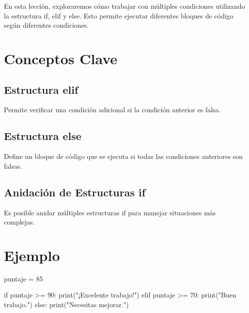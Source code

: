 \documentclass[
  a4paper,
  DIV=11,
  numbers=noendperiod,
  onepage,
  openany]{scrreprt}
\newenvironment{Shaded}{\begin{snugshade}}{\end{snugshade}}
\newcommand{\BuiltInTok}[1]{\textcolor[rgb]{0.00,0.23,0.31}{#1}}
\newcommand{\ControlFlowTok}[1]{\textcolor[rgb]{0.00,0.23,0.31}{#1}}
\newcommand{\DecValTok}[1]{\textcolor[rgb]{0.68,0.00,0.00}{#1}}
\newcommand{\NormalTok}[1]{\textcolor[rgb]{0.00,0.23,0.31}{#1}}
\newcommand{\OperatorTok}[1]{\textcolor[rgb]{0.37,0.37,0.37}{#1}}
\newcommand{\StringTok}[1]{\textcolor[rgb]{0.13,0.47,0.30}{#1}}
\begin{document}
En esta lección, exploraremos cómo trabajar con múltiples condiciones
utilizando la estructura if, elif y else. Esto permite ejecutar
diferentes bloques de código según diferentes condiciones.

\section{Conceptos Clave}\label{conceptos-clave-14}

\subsection{Estructura elif}\label{estructura-elif-1}

Permite verificar una condición adicional si la condición anterior es
falsa.

\subsection{Estructura else}\label{estructura-else-1}

Define un bloque de código que se ejecuta si todas las condiciones
anteriores son falsas.

\subsection{Anidación de Estructuras
if}\label{anidaciuxf3n-de-estructuras-if-1}

Es posible anidar múltiples estructuras if para manejar situaciones más
complejas.

\section{Ejemplo}\label{ejemplo-9}

\begin{Shaded}
\begin{Highlighting}[]
\NormalTok{puntaje }\OperatorTok{=} \DecValTok{85}

\ControlFlowTok{if}\NormalTok{ puntaje }\OperatorTok{\textgreater{}=} \DecValTok{90}\NormalTok{:}
    \BuiltInTok{print}\NormalTok{(}\StringTok{"¡Excelente trabajo!"}\NormalTok{)}
\ControlFlowTok{elif}\NormalTok{ puntaje }\OperatorTok{\textgreater{}=} \DecValTok{70}\NormalTok{:}
    \BuiltInTok{print}\NormalTok{(}\StringTok{"Buen trabajo."}\NormalTok{)}
\ControlFlowTok{else}\NormalTok{:}
    \BuiltInTok{print}\NormalTok{(}\StringTok{"Necesitas mejorar."}\NormalTok{)}
\end{Highlighting}
\end{Shaded}
\end{document}
